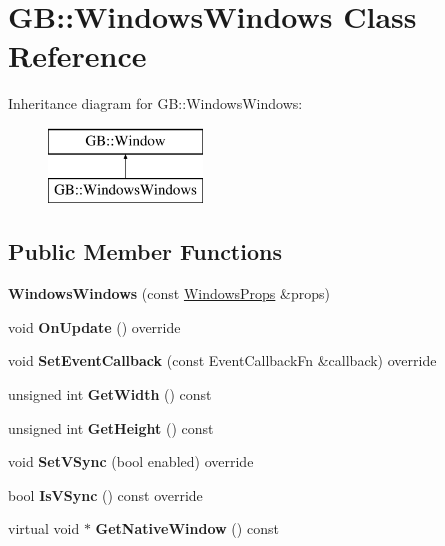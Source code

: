\hypertarget{class_g_b_1_1_windows_windows}{}\section{GB\+::Windows\+Windows Class Reference}
\label{class_g_b_1_1_windows_windows}
Inheritance diagram for GB\+::Windows\+Windows\+:\begin{figure}[H]
\begin{center}
\leavevmode
\includegraphics[height=2.000000cm]{class_g_b_1_1_windows_windows}
\end{center}
\end{figure}
\subsection*{Public Member Functions}
\begin{DoxyCompactItemize}
\item 
\mbox{\label{class_g_b_1_1_windows_windows_aaa4d60b52b4a807059bd7a14fc77ce97}} 
{\bfseries Windows\+Windows} (const \mbox{\hyperlink{struct_g_b_1_1_windows_props}{Windows\+Props}} \&props)
\item 
\mbox{\label{class_g_b_1_1_windows_windows_aecedc86dd084d2b56eb223f85407df70}} 
void {\bfseries On\+Update} () override
\item 
\mbox{\label{class_g_b_1_1_windows_windows_af6d1bf62ccea9bb21220b58bb8c8d84e}} 
void {\bfseries Set\+Event\+Callback} (const Event\+Callback\+Fn \&callback) override
\item 
\mbox{\label{class_g_b_1_1_windows_windows_a6182f3c64793a3d51296a1beb25d2517}} 
unsigned int {\bfseries Get\+Width} () const
\item 
\mbox{\label{class_g_b_1_1_windows_windows_a0f7223c82a4dfe429f1d08e034ef8c2f}} 
unsigned int {\bfseries Get\+Height} () const
\item 
\mbox{\label{class_g_b_1_1_windows_windows_a7a5e4a23086c85241c3cf8e825def0bd}} 
void {\bfseries Set\+V\+Sync} (bool enabled) override
\item 
\mbox{\label{class_g_b_1_1_windows_windows_a21c838057c0f986160884fab9631bf1b}} 
bool {\bfseries Is\+V\+Sync} () const override
\item 
\mbox{\label{class_g_b_1_1_windows_windows_a18b61de46b37e0116dcafda1ea87e8f0}} 
virtual void $\ast$ {\bfseries Get\+Native\+Window} () const
\end{DoxyCompactItemize}
